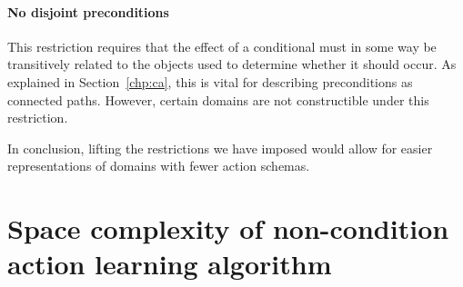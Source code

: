 \documentclass[Master.tex]{subfiles}
\begin{document}
\paragraph{No disjoint preconditions}
This restriction requires that the effect of a conditional must in some way be transitively related to the objects used to determine whether it should occur. As explained in Section~\ref{chp:ca}, this is vital for describing preconditions as connected paths. However, certain domains are not constructible under this restriction. 


In conclusion, lifting the restrictions we have imposed would allow for easier representations of domains with fewer action schemas. 

\section{Space complexity of non-condition action learning algorithm}


%
%
%
%    
%
%    
%
%    
\end{document}
